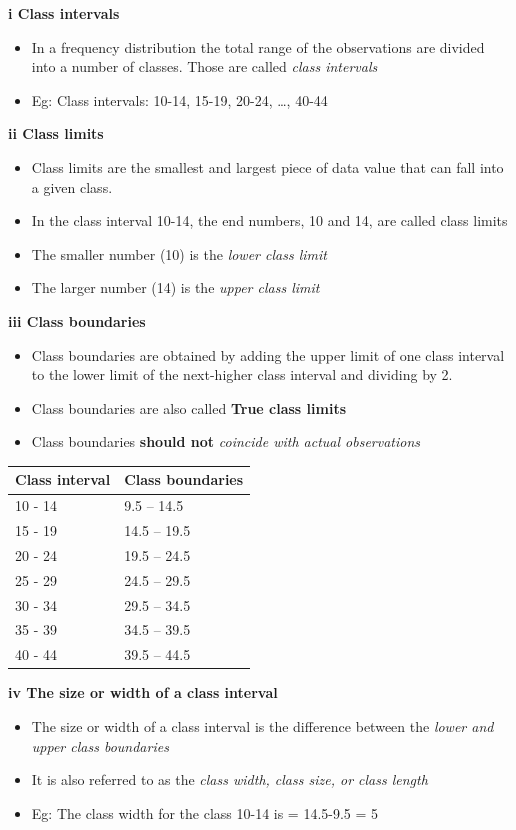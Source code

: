 \documentclass[]{book}
\providecommand{\tightlist}{%
  \setlength{\itemsep}{0pt}\setlength{\parskip}{0pt}}
\begin{document}
\textbf{i Class intervals}

\begin{itemize}
\tightlist
\item
  In a frequency distribution the total range of the observations are divided into a number of classes. Those are called \emph{class intervals}
\item
  Eg: Class intervals: 10-14, 15-19, 20-24, \ldots{}, 40-44
\end{itemize}

\textbf{ii Class limits}

\begin{itemize}
\tightlist
\item
  Class limits are the smallest and largest piece of data value that can fall into a given class.
\item
  In the class interval 10-14, the end numbers, 10 and 14, are called class limits
\item
  The smaller number (10) is the \emph{lower class limit}
\item
  The larger number (14) is the \emph{upper class limit}
\end{itemize}

\textbf{iii Class boundaries}

\begin{itemize}
\tightlist
\item
  Class boundaries are obtained by adding the upper limit of one class interval to the lower limit of the next-higher class interval and dividing by 2.
\item
  Class boundaries are also called \textbf{True class limits}
\item
  Class boundaries \textbf{should not} \emph{coincide with actual observations}
\end{itemize}

\begin{longtable}[]{@{}ll@{}}
\toprule
Class interval & Class boundaries\tabularnewline
\midrule
\endhead
10 - 14 & 9.5 -- 14.5\tabularnewline
15 - 19 & 14.5 -- 19.5\tabularnewline
20 - 24 & 19.5 -- 24.5\tabularnewline
25 - 29 & 24.5 -- 29.5\tabularnewline
30 - 34 & 29.5 -- 34.5\tabularnewline
35 - 39 & 34.5 -- 39.5\tabularnewline
40 - 44 & 39.5 -- 44.5\tabularnewline
\bottomrule
\end{longtable}

\textbf{iv The size or width of a class interval}

\begin{itemize}
\tightlist
\item
  The size or width of a class interval is the difference between the \emph{lower and upper class boundaries}
\item
  It is also referred to as the \emph{class width, class size, or class length}
\item
  Eg: The class width for the class 10-14 is = 14.5-9.5 = 5
\end{itemize}
\end{document}
